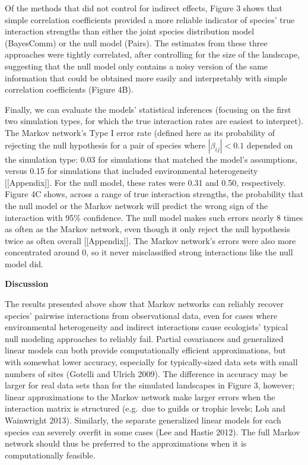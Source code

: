\documentclass[12pt,]{article}
\begin{document}
\begin{spacing}{1.9}
\begin{flushleft}
Of the methods that did not control for indirect effects, Figure 3 shows
that simple correlation coefficients provided a more reliable indicator
of species' true interaction strengths than either the joint species
distribution model (BayesComm) or the null model (Pairs). The estimates
from these three approaches were tightly correlated, after controlling
for the size of the landscape, suggesting that the null model only
contains a noisy version of the same information that could be obtained
more easily and interpretably with simple correlation coefficients
(Figure 4B).

Finally, we can evaluate the models' statistical inferences (focusing on
the first two simulation types, for which the true interaction rates are
easiest to interpret). The Markov network's Type I error rate (defined
here as its probability of rejecting the null hypothesis for a pair of
species where \(|\beta_{ij}|<0.1\) depended on the simulation type: 0.03
for simulations that matched the model's assumptions, versus 0.15 for
simulations that included environmental heterogeneity
{[}{[}Appendix{]}{]}. For the null model, these rates were 0.31 and
0.50, respectively. Figure 4C shows, across a range of true interaction
strengths, the probability that the null model or the Markov network
will predict the wrong sign of the interaction with 95\% confidence. The
null model makes such errors nearly 8 times as often as the Markov
network, even though it only reject the null hypothesis twice as often
overall {[}{[}Appendix{]}{]}. The Markov network's errors were also more
concentrated around 0, so it never misclassified strong interactions
like the null model did.

\noindent
\textbf{Discussion}

\noindent
The results presented above show that Markov networks can reliably
recover species' pairwise interactions from observational data, even for
cases where environmental heterogeneity and indirect interactions cause
ecologists' typical null modeling approaches to reliably fail. Partial
covariances and generalized linear models can both provide
computationally efficient approximations, but with somewhat lower
accuracy, especially for typically-sized data sets with small numbers of
sites (Gotelli and Ulrich 2009). The difference in accuracy may be
larger for real data sets than for the simulated landscapes in Figure 3,
however; linear approximations to the Markov network make larger errors
when the interaction matrix is structured (e.g.~due to guilds or trophic
levels; Loh and Wainwright 2013). Similarly, the separate generalized
linear models for each species can severely overfit in some cases (Lee
and Hastie 2012). The full Markov network should thus be preferred to
the approximations when it is computationally feasible.


\end{flushleft}
\end{spacing}
\end{document}
